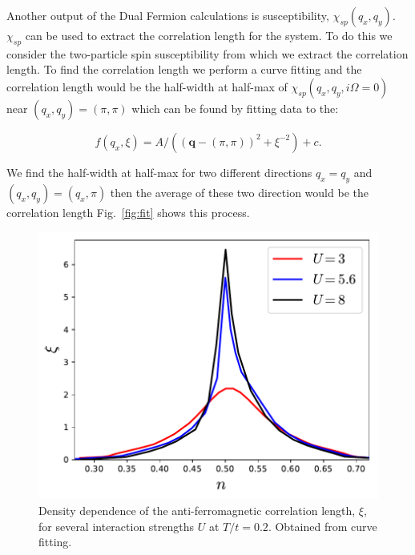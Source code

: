 Another output of the Dual Fermion calculations is susceptibility, $\chi_{sp}(q_x,q_y)$. $\chi_{sp}$ can be used to extract the correlation length for the system. 
To do this we consider the two-particle spin susceptibility\cite{hafermann:2008,chen:2017} from which we extract the correlation length. To find the correlation length we perform a curve fitting and the correlation length would be the half-width at half-max of $\chi_{sp}(q_x,q_y,i\Omega=0)$ near $(q_x,q_y)=(\pi,\pi)$ which can be found by fitting data to the:

\begin{equation}
    f(q_x,\xi)=A/((\mathbf{q}-(\pi,\pi))^2+\xi^{-2}) +c .
\end{equation}

\noindent We find the half-width at half-max for two different directions $q_x=q_y$ and $(q_x,q_y)=(q_x,\pi)$ then the average of these two direction would be the correlation length Fig.~\ref{fig:fit} shows this process. 


\begin{figure}[ht]
\centering
    \includegraphics[width=0.8\linewidth]{fig3/density_cor.pdf}
        \caption{\label{fig:corlengthdoping}Density dependence of the anti-ferromagnetic correlation length, $\xi$, for several interaction strengths $U$ at $T/t=0.2$. Obtained from curve fitting.\cite{rohringer:2016, gukelberger:2017}}
\end{figure}

